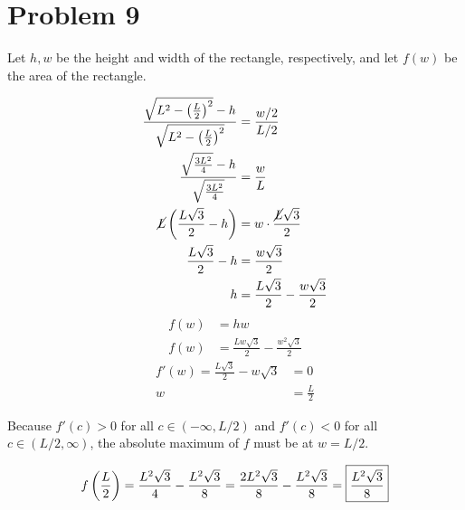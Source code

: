 \documentclass{article}
\newcommand*{\paren}[1]{\ensuremath\left(#1\right)}
\newcommand*{\problem}[1]{\section*{Problem #1}}
\begin{document}
\problem{9}
Let $h,w$ be the height and width of the rectangle, respectively, and let $f(w)$ be the area of the rectangle.
\begin{multicols}{2}
	\begin{align*}
		\frac{\sqrt{L^2-\paren{\frac{L}{2}}^2}-h}{\sqrt{L^2-\paren{\frac{L}{2}}^2}}&=\frac{w/2}{L/2} \\
		\frac{\sqrt{\frac{3L^2}{4}}-h}{\sqrt{\frac{3L^2}{4}}}&=\frac{w}{L} \\
		\cancel{L}\paren{\frac{L\sqrt{3}}{2}-h}&=w\cdot\frac{\cancel{L}\sqrt{3}}{2} \\
		\frac{L\sqrt{3}}{2}-h&=\frac{w\sqrt{3}}{2} \\
		h&=\frac{L\sqrt{3}}{2}-\frac{w\sqrt{3}}{2}
	\end{align*}
	\columnbreak
	\begin{align*}
		f(w)&=hw \\
		f(w)&=\frac{Lw\sqrt{3}}{2}-\frac{w^2\sqrt{3}}{2}
	\end{align*}
	\begin{align*}
		f'(w)=\frac{L\sqrt{3}}{2}-w\sqrt{3}&=0 \\
		w&=\frac{L}{2}
	\end{align*}

	Because $f'(c)>0$ for all $c\in(-\infty,L/2)$ and $f'(c)<0$ for all $c\in(L/2,\infty)$, the absolute maximum of $f$ must be at $w=L/2$.
\end{multicols}
\vspace*{-25pt}
\begin{equation*}
	f\paren{\frac L2}=\frac{L^2\sqrt{3}}{4}-\frac{L^2\sqrt{3}}{8}
	=\frac{2L^2\sqrt{3}}{8}-\frac{L^2\sqrt{3}}{8}
	=\boxed{\frac{L^2\sqrt{3}}{8}}
\end{equation*}
\end{document}
